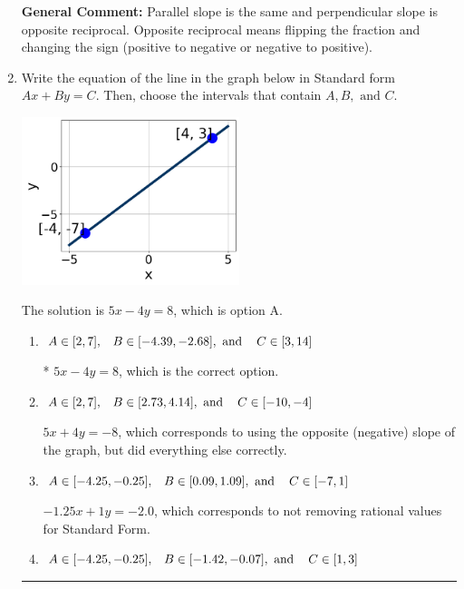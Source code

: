 \documentclass{extbook}[14pt]
\newcommand{\litem}[1]{\item #1

\rule{\textwidth}{0.4pt}}
\begin{document}
\begin{enumerate}
{\textbf{General Comment:} Parallel slope is the same and perpendicular slope is opposite reciprocal. Opposite reciprocal means flipping the fraction and changing the sign (positive to negative or negative to positive).
}
\litem{
Write the equation of the line in the graph below in Standard form $Ax+By=C$. Then, choose the intervals that contain $A, B, \text{ and } C$.

\begin{center}
    \includegraphics[width=0.5\textwidth]{../Figures/linearGraphToStandardCopyC.png}
\end{center}


The solution is \( 5x - 4y = 8 \), which is option A.\begin{enumerate}[label=\Alph*.]
\item \( A \in [2, 7], \hspace{3mm} B \in [-4.39, -2.68], \text{ and } \hspace{3mm} C \in [3, 14] \)

* $5x - 4y = 8$, which is the correct option.
\item \( A \in [2, 7], \hspace{3mm} B \in [2.73, 4.14], \text{ and } \hspace{3mm} C \in [-10, -4] \)

 $5x + 4y = -8$, which corresponds to using the opposite (negative) slope of the graph, but did everything else correctly.
\item \( A \in [-4.25, -0.25], \hspace{3mm} B \in [0.09, 1.09], \text{ and } \hspace{3mm} C \in [-7, 1] \)

 $-1.25x + 1y = -2.0$, which corresponds to not removing rational values for Standard Form.
\item \( A \in [-4.25, -0.25], \hspace{3mm} B \in [-1.42, -0.07], \text{ and } \hspace{3mm} C \in [1, 3] \)


\end{enumerate}}
\end{enumerate}
\end{document}
